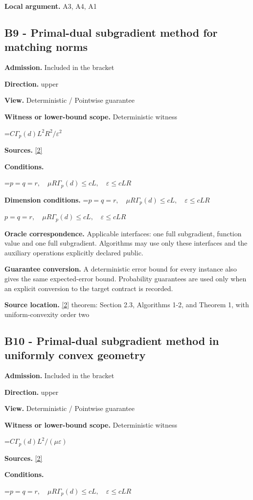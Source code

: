 \documentclass[10pt,a4paper]{article}
\newcommand{\AtlasMath}[1]{\par\begingroup\centering\setbox0=\hbox{$\displaystyle #1$}\ifdim\wd0>1.4\linewidth\typeout{ATLAS WIDE FORMULA: \the\wd0}\fi\ifdim\wd0>\linewidth\resizebox{\linewidth}{!}{\box0}\else\box0\fi\par\endgroup}
\newcommand{\AtlasInlineMath}[1]{\begingroup\setbox0=\hbox{$#1$}\ifdim\wd0>.4\linewidth\endgroup\AtlasMath{#1}\else\endgroup$#1$\fi}
\begin{document}
\textbf{Local argument.} A3, A4, A1

\subsection{B9 - Primal-dual subgradient method for matching norms}
\textbf{Admission.} Included in the bracket

\textbf{Direction.} upper

\textbf{View.} Deterministic / Pointwise guarantee

\textbf{Witness or lower-bound scope.} Deterministic witness

\AtlasMath{C\Gamma_p(d)L^2R^2/\varepsilon^2}
\textbf{Sources.} \href{https://arxiv.org/pdf/1401.1792}{[2]}

\textbf{Conditions.} 
\AtlasMath{p=q=r,\quad\mu R\Gamma_p(d)\le cL,\quad\varepsilon\le cLR}


\textbf{Dimension conditions.} \AtlasInlineMath{p=q=r,\quad\mu R\Gamma_p(d)\le cL,\quad\varepsilon\le cLR}

\textbf{Oracle correspondence.} Applicable interfaces: one full subgradient, function value and one full subgradient. Algorithms may use only these interfaces and the auxiliary operations explicitly declared public.

\textbf{Guarantee conversion.} A deterministic error bound for every instance also gives the same expected-error bound. Probability guarantees are used only when an explicit conversion to the target contract is recorded.

\textbf{Source location.} \href{https://arxiv.org/pdf/1401.1792}{[2]} theorem: Section 2.3, Algorithms 1-2, and Theorem 1, with uniform-convexity order two

\subsection{B10 - Primal-dual subgradient method in uniformly convex geometry}
\textbf{Admission.} Included in the bracket

\textbf{Direction.} upper

\textbf{View.} Deterministic / Pointwise guarantee

\textbf{Witness or lower-bound scope.} Deterministic witness

\AtlasMath{C\Gamma_p(d)L^2/(\mu\varepsilon)}
\textbf{Sources.} \href{https://arxiv.org/pdf/1401.1792}{[2]}

\textbf{Conditions.} 
\AtlasMath{p=q=r,\quad\mu R\Gamma_p(d)\le cL,\quad\varepsilon\le cLR}
\end{document}
